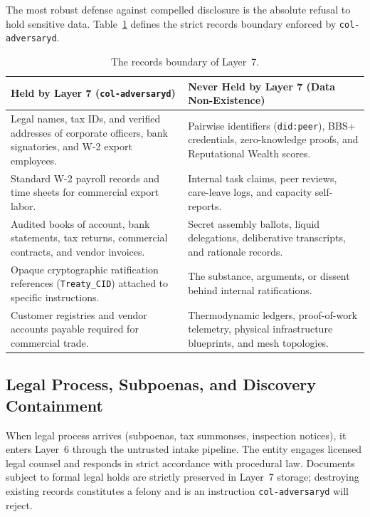 The most robust defense against compelled disclosure is the absolute refusal to hold sensitive data. Table~\ref{tab:l7-records} defines the strict records boundary enforced by \texttt{col-adversaryd}.

\begin{table}[htbp]
\centering
\small
\begin{tabular}{|p{}|p{}|}
\hline
\textbf{Held by Layer 7 (\texttt{col-adversaryd})} & \textbf{Never Held by Layer 7 (Data Non-Existence)} \\
\hline
Legal names, tax IDs, and verified addresses of corporate officers, bank signatories, and W-2 export employees. & Pairwise identifiers (\texttt{did:peer}), BBS+ credentials, zero-knowledge proofs, and Reputational Wealth scores. \\
\hline
Standard W-2 payroll records and time sheets for commercial export labor. & Internal task claims, peer reviews, care-leave logs, and capacity self-reports. \\
\hline
Audited books of account, bank statements, tax returns, commercial contracts, and vendor invoices. & Secret assembly ballots, liquid delegations, deliberative transcripts, and rationale records. \\
\hline
Opaque cryptographic ratification references (\texttt{Treaty\_CID}) attached to specific instructions. & The substance, arguments, or dissent behind internal ratifications. \\
\hline
Customer registries and vendor accounts payable required for commercial trade. & Thermodynamic ledgers, proof-of-work telemetry, physical infrastructure blueprints, and mesh topologies. \\
\hline
\end{tabular}
\caption{The records boundary of Layer~7.}
\label{tab:l7-records}
\end{table}

\subsection{Legal Process, Subpoenas, and Discovery Containment}

When legal process arrives (subpoenas, tax summonses, inspection notices), it enters Layer~6 through the untrusted intake pipeline. The entity engages licensed legal counsel and responds in strict accordance with procedural law. Documents subject to formal legal holds are strictly preserved in Layer~7 storage; destroying existing records constitutes a felony and is an instruction \texttt{col-adversaryd} will reject. 

